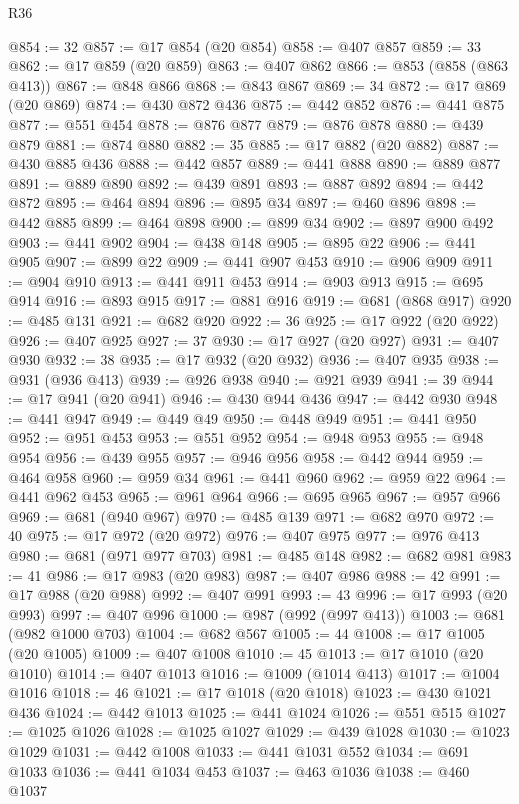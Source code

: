 \begin{lexlean}{R36}
\begin{coremodule}
@854 := 32
@857 := @17 @854 (@20 @854)
@858 := @407 @857
@859 := 33
@862 := @17 @859 (@20 @859)
@863 := @407 @862
@866 := @853 (@858 (@863 @413))
@867 := @848 @866
@868 := @843 @867
@869 := 34
@872 := @17 @869 (@20 @869)
@874 := @430 @872 @436
@875 := @442 @852
@876 := @441 @875
@877 := @551 @454
@878 := @876 @877
@879 := @876 @878
@880 := @439 @879
@881 := @874 @880
@882 := 35
@885 := @17 @882 (@20 @882)
@887 := @430 @885 @436
@888 := @442 @857
@889 := @441 @888
@890 := @889 @877
@891 := @889 @890
@892 := @439 @891
@893 := @887 @892
@894 := @442 @872
@895 := @464 @894
@896 := @895 @34
@897 := @460 @896
@898 := @442 @885
@899 := @464 @898
@900 := @899 @34
@902 := @897 @900 @492
@903 := @441 @902
@904 := @438 @148
@905 := @895 @22
@906 := @441 @905
@907 := @899 @22
@909 := @441 @907 @453
@910 := @906 @909
@911 := @904 @910
@913 := @441 @911 @453
@914 := @903 @913
@915 := @695 @914
@916 := @893 @915
@917 := @881 @916
@919 := @681 (@868 @917)
@920 := @485 @131
@921 := @682 @920
@922 := 36
@925 := @17 @922 (@20 @922)
@926 := @407 @925
@927 := 37
@930 := @17 @927 (@20 @927)
@931 := @407 @930
@932 := 38
@935 := @17 @932 (@20 @932)
@936 := @407 @935
@938 := @931 (@936 @413)
@939 := @926 @938
@940 := @921 @939
@941 := 39
@944 := @17 @941 (@20 @941)
@946 := @430 @944 @436
@947 := @442 @930
@948 := @441 @947
@949 := @449 @49
@950 := @448 @949
@951 := @441 @950
@952 := @951 @453
@953 := @551 @952
@954 := @948 @953
@955 := @948 @954
@956 := @439 @955
@957 := @946 @956
@958 := @442 @944
@959 := @464 @958
@960 := @959 @34
@961 := @441 @960
@962 := @959 @22
@964 := @441 @962 @453
@965 := @961 @964
@966 := @695 @965
@967 := @957 @966
@969 := @681 (@940 @967)
@970 := @485 @139
@971 := @682 @970
@972 := 40
@975 := @17 @972 (@20 @972)
@976 := @407 @975
@977 := @976 @413
@980 := @681 (@971 @977 @703)
@981 := @485 @148
@982 := @682 @981
@983 := 41
@986 := @17 @983 (@20 @983)
@987 := @407 @986
@988 := 42
@991 := @17 @988 (@20 @988)
@992 := @407 @991
@993 := 43
@996 := @17 @993 (@20 @993)
@997 := @407 @996
@1000 := @987 (@992 (@997 @413))
@1003 := @681 (@982 @1000 @703)
@1004 := @682 @567
@1005 := 44
@1008 := @17 @1005 (@20 @1005)
@1009 := @407 @1008
@1010 := 45
@1013 := @17 @1010 (@20 @1010)
@1014 := @407 @1013
@1016 := @1009 (@1014 @413)
@1017 := @1004 @1016
@1018 := 46
@1021 := @17 @1018 (@20 @1018)
@1023 := @430 @1021 @436
@1024 := @442 @1013
@1025 := @441 @1024
@1026 := @551 @515
@1027 := @1025 @1026
@1028 := @1025 @1027
@1029 := @439 @1028
@1030 := @1023 @1029
@1031 := @442 @1008
@1033 := @441 @1031 @552
@1034 := @691 @1033
@1036 := @441 @1034 @453
@1037 := @463 @1036
@1038 := @460 @1037

\end{coremodule}
\end{lexlean}
